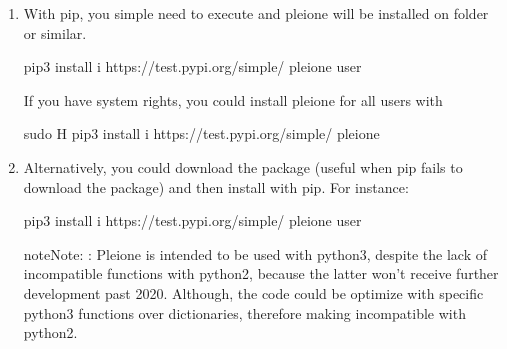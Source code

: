 \documentclass[letterpaper,10pt,english]{sphinxmanual}
\begin{document}
\begin{enumerate}
\def\theenumi{\arabic{enumi}}
\def\labelenumi{\theenumi .}
\makeatletter\def\p@enumii{\p@enumi \theenumi .}\makeatother
\item {} 

With pip, you simple need to execute and pleione will be installed on
 folder or similar.

%
\begin{sphinxVerbatim}[commandchars=\\\{\}]
pip3 install \PYGZhy{}i https://test.pypi.org/simple/ pleione \PYGZhy{}\PYGZhy{}user
\end{sphinxVerbatim}

If you have system rights, you could install pleione for all users with

%
\begin{sphinxVerbatim}[commandchars=\\\{\}]
sudo \PYGZhy{}H pip3 install \PYGZhy{}i https://test.pypi.org/simple/ pleione
\end{sphinxVerbatim}

\item {} 

Alternatively, you could download the package (useful when pip fails to
download the package) and then install with pip. For instance:

%
\begin{sphinxVerbatim}[commandchars=\\\{\}]
pip3 install \PYGZhy{}i https://test.pypi.org/simple/ pleione \PYGZhy{}\PYGZhy{}user
\end{sphinxVerbatim}

\begin{sphinxadmonition}{note}{Note:}
:
Pleione is intended to be used with python3, despite the lack of
incompatible functions with python2, because the latter won’t receive
further development past 2020. Although, the code could be optimize with
specific python3 functions over dictionaries, therefore making incompatible
with python2.
\end{sphinxadmonition}


\end{enumerate}
\end{document}

